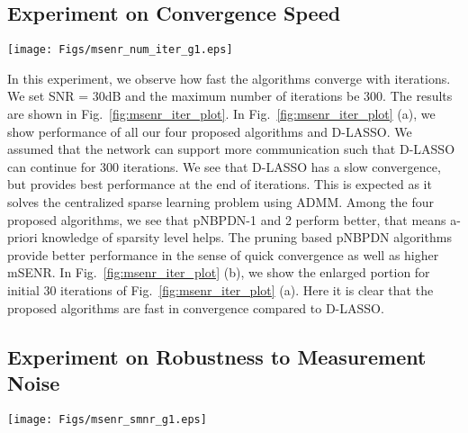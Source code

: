 \documentclass[journal]{IEEEtran}
\begin{document}
\subsection{Experiment on Convergence Speed}
\begin{figure*}
\hspace{-14mm}
\texttt{[image: Figs/msenr\_num\_iter\_g1.eps]}
\caption{Performance of various algorithms with respect to number of iterations over network (number of information exchanging iterations). We set $M = 100$, $N = 500$, $s = 20$, $L = 20$, $d = 4$, and $\text{SNR} = 30$dB. (a) Performances are shown for 300 iterations where we use logarithmic scale to show iterations. (b) Performances are shown for 30 iterations to show quick convergence of proposed algorithms compared to D-LASSO.}
\label{fig:msenr_iter_plot}
\end{figure*}

In this experiment, we observe how fast the algorithms converge with iterations. We set SNR = 30dB and the maximum number of iterations be 300. The results are shown in Fig.~\ref{fig:msenr_iter_plot}. In Fig.~\ref{fig:msenr_iter_plot} (a), we show performance of all our four proposed algorithms and D-LASSO. We assumed that the network can support more communication such that D-LASSO can continue for 300 iterations. We see that D-LASSO has a slow convergence, but provides best performance at the end of iterations. This is expected as it solves the centralized sparse learning problem using ADMM. Among the four proposed algorithms, we see that pNBPDN-1 and 2 perform better, that means a-priori knowledge of sparsity level helps. The pruning based pNBPDN algorithms provide better performance in the sense of quick convergence as well as higher mSENR. In Fig.~\ref{fig:msenr_iter_plot} (b), we show the enlarged portion for initial 30 iterations of Fig.~\ref{fig:msenr_iter_plot} (a). Here it is clear that the proposed algorithms are fast in convergence compared to D-LASSO. 

\subsection{Experiment on Robustness to Measurement Noise}

\begin{figure*}
\hspace{-10mm}
\texttt{[image: Figs/msenr\_smnr\_g1.eps]}
\caption{Performance comparison of BPDN, D-LASSO and pNBPDN-2 algorithms with respect to SNR. We set M = 100, N = 500, s = 20, L = 20, d = 4. (a) For maximum number of iterations 300. (b) For maximum number of iterations 30.}
\label{fig:msenr_snr_plot}
\end{figure*}
\end{document}
